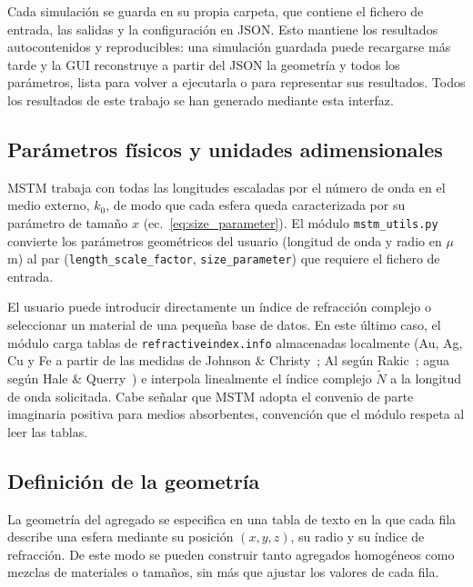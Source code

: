 Cada simulación se guarda en su propia carpeta, que contiene el fichero
de entrada, las salidas y la configuración en JSON. Esto mantiene los
resultados autocontenidos y reproducibles: una simulación guardada puede
recargarse más tarde y la GUI reconstruye a partir del JSON la geometría
y todos los parámetros, lista para volver a ejecutarla o para representar
sus resultados. Todos los resultados de este trabajo se han generado
mediante esta interfaz.

\subsection{Parámetros físicos y unidades adimensionales}
\label{subsec:mstm_utils}

MSTM trabaja con todas las longitudes escaladas por el número de onda en
el medio externo, $k_{0}$,
de modo que cada esfera queda caracterizada por su parámetro de tamaño
$x$ (ec.~\ref{eq:size_parameter}). El módulo \texttt{mstm\_utils.py} convierte
los parámetros geométricos del usuario (longitud de onda y radio en
$\mu$m) al par (\texttt{length\_scale\_factor}, \texttt{size\_parameter})
que requiere el fichero de entrada.

El usuario puede introducir directamente un índice de refracción
complejo o seleccionar un material de una pequeña base de datos. En este
último caso, el módulo carga tablas de
\texttt{refractiveindex.info} almacenadas localmente (Au, Ag, Cu y Fe a
partir de las medidas de Johnson \& Christy~\cite{johnson1972optical}; 
Al según Rakic~\cite{Rakic1995}; agua según
Hale \& Querry~\cite{Hale1973}) e interpola linealmente el índice complejo
$\tilde{N}$ a la longitud de onda solicitada. 
Cabe señalar que MSTM adopta el convenio de parte
imaginaria positiva para medios absorbentes, convención que el módulo
respeta al leer las tablas.

\subsection{Definición de la geometría}
\label{subsec:geometria}

La geometría del agregado se especifica en una tabla de texto en la que
cada fila describe una esfera mediante su posición $(x,y,z)$, su radio y
su índice de refracción. De este modo se pueden construir tanto agregados
homogéneos como mezclas de materiales o tamaños, sin más que ajustar los
valores de cada fila.

